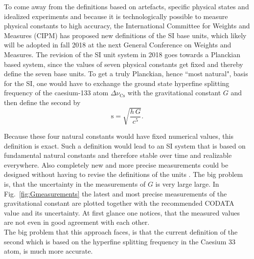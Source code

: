 \documentclass[prb,preprint]{revtex4-1}
\begin{document}
To come away from the definitions based on artefacts, specific physical states and idealized experiments and because it is technologically possible to measure physical constants to high accuracy, the International Committee for Weights and Measures (CIPM) has proposed new definitions of the SI base units, which likely will be adopted in fall 2018 at the next General Conference on Weights and Measures. The revision of the SI unit system in 2018 goes towards a Planckian based system, since the values of seven physical constants get fixed and thereby define the seven base units. 
To get a truly Planckian, hence ``most natural", basis for the SI, one would have to exchange the ground state hyperfine splitting frequency of the caesium-133 atom $\Delta \nu_{\mathrm{Cs}}$ with the gravitational constant $G$ and then define the second by  
\begin{equation}
\mathrm{s} = \sqrt{\frac{h \, G}{c^5}}.
\end{equation}



Because these four natural constants would have fixed numerical values, this definition is exact. Such a definition would lead to an SI system that is based on fundamental natural constants and therefore stable over time and realizable everywhere. Also completely new and more precise measurements could be designed without having to revise the definitions of the units \cite{Fischer16}. The big problem is, that the uncertainty in the measurements of $G$ is very large large. In Fig.~\ref{fig:Gmeasurements} the latest and most precise measurements of the gravitational constant are plotted together with the recommended CODATA value and its uncertainty. At first glance one notices, that the measured values are not even in good agreement with each other.\\

The big problem that this approach faces, is that the current definition of the second which is based on the hyperfine splitting frequency in the Caesium 33 atom, is much more accurate. \\  
\end{document}
